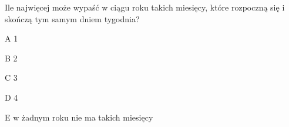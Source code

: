 \begin{tresc}
Ile najwięcej może wypaść w ciągu roku takich miesięcy, które rozpoczną się i skończą tym samym dniem tygodnia?
\end{tresc}
\begin{wariant}{A} 1 \end{wariant}
\begin{wariant}{B} 2 \end{wariant}
\begin{wariant}{C} 3 \end{wariant}
\begin{wariant}{D} 4 \end{wariant}
\begin{wariant}{E} w żadnym roku nie ma takich miesięcy \end{wariant}
